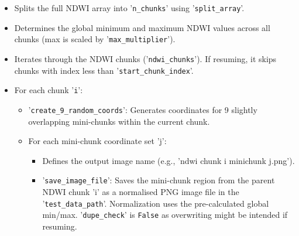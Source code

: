 \begin{itemize}
    \item Splits the full NDWI array into '\verb|n_chunks|' using '\verb|split_array|'.
    \item Determines the global minimum and maximum NDWI values across all chunks (max is scaled by '\verb|max_multiplier|').
    \item Iterates through the NDWI chunks ('\verb|ndwi_chunks|'). If resuming, it skips chunks with index less than '\verb|start_chunk_index|'.
    \item For each chunk '\verb|i|':
    \begin{itemize}
        \item '\verb|create_9_random_coords|': Generates coordinates for 9 slightly overlapping mini-chunks within the current chunk.
        \item For each mini-chunk coordinate set 'j':
        \begin{itemize}
            \item Defines the output image name (e.g., 'ndwi chunk i minichunk j.png').
            \item '\verb|save_image_file|': Saves the mini-chunk region from the parent NDWI chunk 'i' as a normalised PNG image file in the '\verb|test_data_path|'. Normalization uses the pre-calculated global min/max. '\verb|dupe_check|' is \verb|False| as overwriting might be intended if resuming.
        \end{itemize}
    \end{itemize}
\end{itemize}

